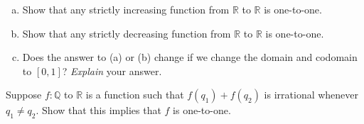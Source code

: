 \begin{exercise}{}
\begin{enumerate}[(a)]
\item
 Show that any strictly increasing function  from $\mathbb{R}$ to $\mathbb{R}$ is one-to-one.
\item
 Show that any strictly decreasing function  from $\mathbb{R}$ to $\mathbb{R}$ is one-to-one.
\item
Does the answer to (a) or (b) change if we change the domain and codomain to $[0,1]$?  \emph{Explain} your answer.
\end{enumerate}
\end{exercise}

\begin{exercise}{}
Suppose  $f:\mathbb{Q}$ to $\mathbb{R}$ is a function such that $f(q_1) + f(q_2)$ is irrational whenever $q_1 \neq q_2$.
Show that this implies that $f$ is one-to-one.
\end{exercise}





 





